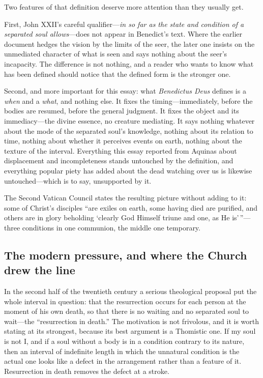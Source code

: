 Two features of that definition deserve more attention than they usually get.

First, John XXII's careful qualifier---\emph{in so far as the state and condition of a separated soul allows}---does not appear in Benedict's text. Where the earlier document hedges the vision by the limits of the seer, the later one insists on the unmediated character of what is seen and says nothing about the seer's incapacity. The difference is not nothing, and a reader who wants to know what has been defined should notice that the defined form is the stronger one.

Second, and more important for this essay: what \emph{Benedictus Deus} defines is a \emph{when} and a \emph{what}, and nothing else. It fixes the timing---immediately, before the bodies are resumed, before the general judgment. It fixes the object and its immediacy---the divine essence, no creature mediating. It says nothing whatever about the mode of the separated soul's knowledge, nothing about its relation to time, nothing about whether it perceives events on earth, nothing about the texture of the interval. Everything this essay reported from Aquinas about displacement and incompleteness stands untouched by the definition, and everything popular piety has added about the dead watching over us is likewise untouched---which is to say, unsupported by it.

The Second Vatican Council states the resulting picture without adding to it: some of Christ's disciples ``are exiles on earth, some having died are purified, and others are in glory beholding `clearly God Himself triune and one, as He is'\,''---three conditions in one communion, the middle one temporary.

\subsection{The modern pressure, and where the Church drew the line}

In the second half of the twentieth century a serious theological proposal put the whole interval in question: that the resurrection occurs for each person at the moment of his own death, so that there is no waiting and no separated soul to wait---the ``resurrection in death.'' The motivation is not frivolous, and it is worth stating at its strongest, because its best argument is a Thomistic one. If my soul is not I, and if a soul without a body is in a condition contrary to its nature, then an interval of indefinite length in which the unnatural condition is the actual one looks like a defect in the arrangement rather than a feature of it. Resurrection in death removes the defect at a stroke.

